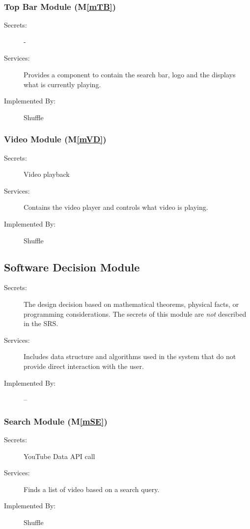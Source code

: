 \documentclass[12pt, titlepage]{article}
\newcommand{\mref}[1]{M\ref{#1}}
\begin{document}
\subsubsection{Top Bar Module (\mref{mTB})}

\begin{description}
\item[Secrets:] -
\item[Services:] Provides a component to contain the search bar, logo and the displays what is currently playing.
\item[Implemented By:] Shuffle
\end{description}

\subsubsection{Video Module (\mref{mVD})}

\begin{description}
\item[Secrets:] Video playback
\item[Services:] Contains the video player and controls what video is playing.
\item[Implemented By:] Shuffle
\end{description}

\subsection{Software Decision Module}

\begin{description}
\item[Secrets:] The design decision based on mathematical theorems, physical
  facts, or programming considerations. The secrets of this module are
  \emph{not} described in the SRS.
\item[Services:] Includes data structure and algorithms used in the system that
  do not provide direct interaction with the user. 
\item[Implemented By:] --
\end{description}

\subsubsection{Search Module (\mref{mSE})}

\begin{description}
\item[Secrets:] YouTube Data API call
\item[Services:] Finds a list of video based on a search query.
\item[Implemented By:] Shuffle
\end{description}
\end{document}

